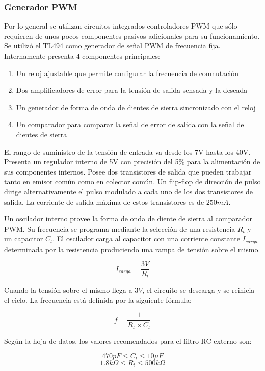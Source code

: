 \subsubsection{Generador PWM}

Por lo general se utilizan circuitos integrados controladores PWM que sólo requieren de unos pocos componentes pasivos adicionales para su funcionamiento. 
Se utilizó el TL494 como generador de señal PWM de frecuencia fija. 
Internamente presenta 4 componentes principales:
\begin{enumerate}
    \item Un reloj ajustable que permite configurar la frecuencia de conmutación
    \item Dos amplificadores de error para la tensión de salida sensada y la deseada
    \item Un generador de forma de onda de dientes de sierra sincronizado con el reloj
    \item Un comparador para comparar la señal de error de salida con la señal de dientes de sierra
\end{enumerate}
 
El rango de suministro de la tensión de entrada va desde los 7V hasta los 40V. 
Presenta un regulador interno de 5V con precisión del 5\% para la alimentación de sus componentes internos.
Posee dos transistores de salida que pueden trabajar tanto en emisor común como en colector común. 
Un flip-flop de dirección de pulso dirige alternativamente el pulso modulado a cada uno de los dos transistores de salida. 
La corriente de salida máxima de estos transistores es de $250mA$.

Un oscilador interno provee la forma de onda de diente de sierra al comparador PWM. 
Su frecuencia se programa mediante la selección de una resistencia $R_t$ y un capacitor $C_t$. 
El oscilador carga al capacitor con una corriente constante $I_{carga}$ determinada por la resistencia produciendo una rampa de tensión sobre el mismo.

$$ I_{carga}=\frac{3V}{R_t} $$

Cuando la tensión sobre el mismo llega a $3V$, el circuito se descarga y se reinicia el ciclo. 
La frecuencia está definida por la siguiente fórmula:

$$ f=\frac{1}{R_t\times C_t} $$

Según la hoja de datos, los valores recomendados para el filtro RC externo son:

$$ 470pF\leq C_t\leq 10\mu F$$
$$ 1.8k\Omega\leq R_t\leq 500k\Omega $$

